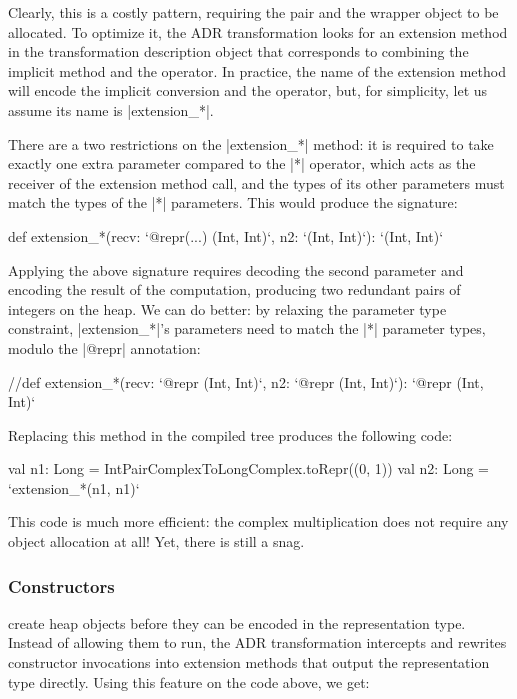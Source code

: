 Clearly, this is a costly pattern, requiring the pair and the wrapper object to be allocated. To optimize it, the ADR transformation looks for an extension method in the transformation description object that corresponds to combining the implicit method and the operator. In practice, the name of the extension method will encode the implicit conversion and the operator, but, for simplicity, let us assume its name is |extension_*|.

There are a two restrictions on the |extension_*| method: it is required to take exactly one extra parameter compared to the |*| operator, which acts as the receiver of the extension method call, and the types of its other parameters must match the types of the |*| parameters. This would produce the signature:

\begin{lstlisting-nobreak}
def extension_*(recv: `@repr(...) (Int, Int)`, n2: `(Int, Int)`): `(Int, Int)`
\end{lstlisting-nobreak}

Applying the above signature requires decoding the second parameter and encoding the result of the computation, producing two redundant pairs of integers on the heap. We can do better: by relaxing the parameter type constraint, |extension_*|'s parameters need to match the |*| parameter types, modulo the |@repr| annotation: %

\begin{lstlisting-nobreak}
//def extension_*(recv: `@repr (Int, Int)`,  n2: `@repr (Int, Int)`): `@repr (Int, Int)`
\end{lstlisting-nobreak}

Replacing this method in the compiled tree produces the following code:

\begin{lstlisting-nobreak}
val n1: Long = IntPairComplexToLongComplex.toRepr((0, 1))
val n2: Long = `extension_*(n1, n1)`
\end{lstlisting-nobreak}

This code is much more efficient: the complex multiplication does not require any object allocation at all! Yet, there is still a snag.

\subsubsection{Constructors} create heap objects before they can be encoded in the representation type. Instead of allowing them to run, the ADR transformation intercepts and rewrites constructor invocations into extension methods that output the representation type directly. Using this feature on the code above, we get:

